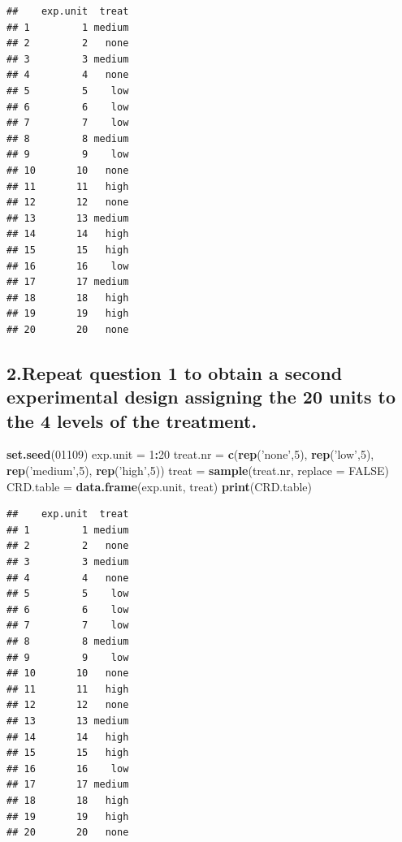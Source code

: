 \documentclass[
]{article}
\newenvironment{Shaded}{\begin{snugshade}}{\end{snugshade}}
\newcommand{\DataTypeTok}[1]{\textcolor[rgb]{0.13,0.29,0.53}{#1}}
\newcommand{\DecValTok}[1]{\textcolor[rgb]{0.00,0.00,0.81}{#1}}
\newcommand{\KeywordTok}[1]{\textcolor[rgb]{0.13,0.29,0.53}{\textbf{#1}}}
\newcommand{\NormalTok}[1]{#1}
\newcommand{\OperatorTok}[1]{\textcolor[rgb]{0.81,0.36,0.00}{\textbf{#1}}}
\newcommand{\OtherTok}[1]{\textcolor[rgb]{0.56,0.35,0.01}{#1}}
\newcommand{\StringTok}[1]{\textcolor[rgb]{0.31,0.60,0.02}{#1}}
\begin{document}
\begin{verbatim}
##    exp.unit  treat
## 1         1 medium
## 2         2   none
## 3         3 medium
## 4         4   none
## 5         5    low
## 6         6    low
## 7         7    low
## 8         8 medium
## 9         9    low
## 10       10   none
## 11       11   high
## 12       12   none
## 13       13 medium
## 14       14   high
## 15       15   high
## 16       16    low
## 17       17 medium
## 18       18   high
## 19       19   high
## 20       20   none
\end{verbatim}

\hypertarget{repeat-question-1-to-obtain-a-second-experimental-design-assigning-the-20-units-to-the-4-levels-of-the-treatment.}{%
\subsection{2.Repeat question 1 to obtain a second experimental design
assigning the 20 units to the 4 levels of the
treatment.}\label{repeat-question-1-to-obtain-a-second-experimental-design-assigning-the-20-units-to-the-4-levels-of-the-treatment.}}

\begin{Shaded}
\begin{Highlighting}[]
\KeywordTok{set.seed}\NormalTok{(}\DecValTok{01109}\NormalTok{)}
\NormalTok{exp.unit =}\StringTok{ }\DecValTok{1}\OperatorTok{:}\DecValTok{20}
\NormalTok{treat.nr =}\StringTok{ }\KeywordTok{c}\NormalTok{(}\KeywordTok{rep}\NormalTok{(}\StringTok{'none'}\NormalTok{,}\DecValTok{5}\NormalTok{), }\KeywordTok{rep}\NormalTok{(}\StringTok{'low'}\NormalTok{,}\DecValTok{5}\NormalTok{), }\KeywordTok{rep}\NormalTok{(}\StringTok{'medium'}\NormalTok{,}\DecValTok{5}\NormalTok{), }\KeywordTok{rep}\NormalTok{(}\StringTok{'high'}\NormalTok{,}\DecValTok{5}\NormalTok{))}
\NormalTok{treat =}\StringTok{ }\KeywordTok{sample}\NormalTok{(treat.nr, }\DataTypeTok{replace =} \OtherTok{FALSE}\NormalTok{)}
\NormalTok{CRD.table =}\StringTok{ }\KeywordTok{data.frame}\NormalTok{(exp.unit, treat)}
\KeywordTok{print}\NormalTok{(CRD.table)}
\end{Highlighting}
\end{Shaded}

\begin{verbatim}
##    exp.unit  treat
## 1         1 medium
## 2         2   none
## 3         3 medium
## 4         4   none
## 5         5    low
## 6         6    low
## 7         7    low
## 8         8 medium
## 9         9    low
## 10       10   none
## 11       11   high
## 12       12   none
## 13       13 medium
## 14       14   high
## 15       15   high
## 16       16    low
## 17       17 medium
## 18       18   high
## 19       19   high
## 20       20   none
\end{verbatim}
\end{document}
